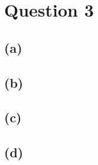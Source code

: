 
\section{Question 3}
    \subsection{(a)}
    \subsection{(b)}
    \subsection{(c)}
    \subsection{(d)}
